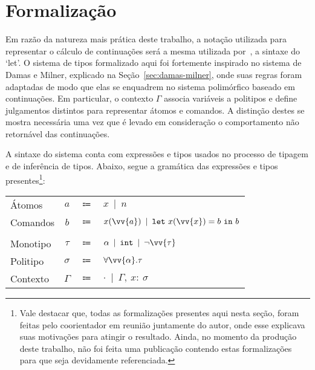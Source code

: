 \section{Formalização}\label{sec:formalizacao}

Em razão da natureza mais prática deste trabalho, a notação utilizada para representar o cálculo de continuações será a mesma utilizada por~\cite{appel1997shrinking}, a sintaxe do `let'.
O sistema de tipos formalizado aqui foi fortemente inspirado no sistema de Damas e Milner, explicado na Seção~\ref{sec:damas-milner}, onde suas regras foram adaptadas de modo que elas se enquadrem no sistema polimórfico baseado em continuações.
Em particular, o contexto $\Gamma$ associa variáveis a politipos e define julgamentos distintos para representar átomos e comandos.
A distinção destes se mostra necessária uma vez que é levado em consideração o comportamento não retornável das continuações. 

A sintaxe do sistema conta com expressões e tipos usados no processo de tipagem e de inferência de tipos.
Abaixo, segue a gramática das expressões e tipos presentes\footnote{Vale destacar que, todas as formalizações presentes aqui nesta seção, foram feitas pelo coorientador em reunião juntamente do autor, onde esse explicava suas motivações para atingir o resultado. Ainda, no momento da produção deste trabalho, não foi feita uma publicação contendo estas formalizações para que seja devidamente referenciada.}:

\phantom{Newline}

\begin{tabular}{lccl}
  Átomos & $a$ & $\Coloneqq$ & $x \enspace|\enspace n$ \\
  Comandos & $b$ & $\Coloneqq$ & $x(\vv{a}) \enspace|\enspace \mathtt{let}\ x(\vv{x}) = b\ \mathtt{in}\ b$ \\
  \\
  Monotipo & $\tau$ & $\Coloneqq$ & $\alpha \enspace|\enspace \mathtt{int} \enspace|\enspace \neg\vv{\tau}$ \\
  Politipo & $\sigma$ & $\Coloneqq$ & $\forall\vv{\alpha}.\tau$ \\
  Contexto & $\Gamma$ & $\Coloneqq$ & $\cdot \enspace|\enspace \Gamma,\ x{:}\ \sigma$ \\
\end{tabular}\label{cps-type-system}

\phantom{Newline}


